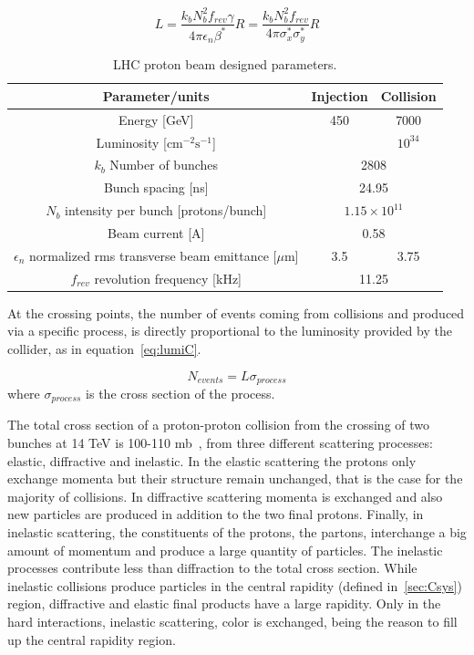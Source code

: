 \begin{equation}
  \label{eq:lumiC}
  L=\frac{k_{b}N_{b}^{2}f_{rev}\gamma}{4\pi\epsilon_{n}\beta^{*}}R=\frac{k_{b}N_{b}^{2}f_{rev}}{4\pi\sigma^{*}_{x}\sigma^{*}_{y}}R
\end{equation}

\begin{table}[htbH]
\begin{center}
\caption{LHC proton beam designed parameters.\label{tab:LHCparams}}
\begin{tabular}{|c|c c|}
\hline 
Parameter/units & Injection & Collision \\
\hline
Energy [GeV]& 450 & 7000 \\ 
Luminosity [$\text{cm}^{-2}\text{s}^{-1}$] & & $10^{34}$ \\
$k_{b}$ Number of bunches & \multicolumn{2}{c|}{2808} \\
Bunch spacing [ns] & \multicolumn{2}{c|}{24.95} \\
$N_{b}$ intensity per bunch [protons/bunch] & \multicolumn{2}{c|}{$1.15\times 10^{11}$} \\
Beam current [A] & \multicolumn{2}{c|}{0.58} \\
$\epsilon_{n}$ normalized rms transverse beam emittance [$\mu$m] & 3.5 & 3.75 \\ 
$f_{rev}$ revolution frequency [kHz] & \multicolumn{2}{c|}{11.25} \\
\hline
\end{tabular}
\end{center}
\end{table}

At the crossing points, the number of events coming from collisions and produced via a specific process, is directly proportional to the luminosity provided by the collider, as in equation~\ref{eq:lumiC}.

\begin{equation}
  \label{eq:lumiN}
  N_{events}=L\sigma_{process}
\end{equation} where $\sigma_{process}$ is the cross section of the process. 

The total cross section of a proton-proton collision from the crossing of two bunches at 14 TeV is 100-110 mb~\cite{Augier:1993ta}, from three different scattering processes: elastic, diffractive and inelastic. In the elastic scattering the protons only exchange momenta but their structure remain unchanged, that is the case for the majority of collisions. In diffractive scattering momenta is exchanged and also new particles are produced in addition to the two final protons. Finally, in inelastic scattering, the constituents of the protons, the partons, interchange a big amount of momentum and produce a large quantity of particles. The inelastic processes contribute less than diffraction to the total cross section. While inelastic collisions produce particles in the central rapidity (defined in~\ref{sec:Csys}) region, diffractive and elastic final products have a large rapidity. Only in the hard interactions, inelastic scattering, color is exchanged, being the reason to fill up the central rapidity region. 

